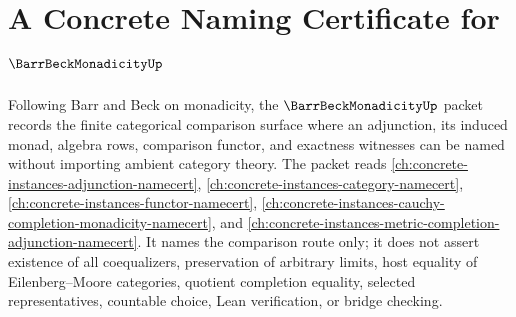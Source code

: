 \chapter{A Concrete Naming Certificate for $\BarrBeckMonadicityUp$}
\label{ch:concrete-instances-barr-beck-monadicity-namecert}

Following Barr and Beck on monadicity, the $\BarrBeckMonadicityUp$ packet records the finite categorical comparison surface where an adjunction, its induced monad, algebra rows, comparison functor, and exactness witnesses can be named without importing ambient category theory. The packet reads \autoref{ch:concrete-instances-adjunction-namecert}, \autoref{ch:concrete-instances-category-namecert}, \autoref{ch:concrete-instances-functor-namecert}, \autoref{ch:concrete-instances-cauchy-completion-monadicity-namecert}, and \autoref{ch:concrete-instances-metric-completion-adjunction-namecert}. It names the comparison route only; it does not assert existence of all coequalizers, preservation of arbitrary limits, host equality of Eilenberg--Moore categories, quotient completion equality, selected representatives, countable choice, Lean verification, or bridge checking.

